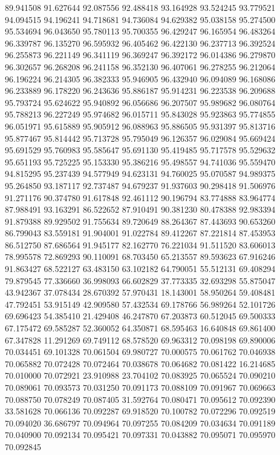 89.941508
91.627644
92.087556
92.488418
93.164928
93.524245
93.779521
94.094515
94.196241
94.718681
94.736084
94.629382
95.038158
95.274500
95.534694
96.043650
95.780113
95.700355
96.429247
96.165954
96.483264
96.339787
96.135270
96.595932
96.405462
96.422130
96.237713
96.392524
96.255873
96.221149
96.341119
96.369247
96.392172
96.014386
96.279870
96.302657
96.268208
96.241158
96.352130
96.407061
96.278255
96.212064
96.196224
96.214305
96.382333
95.946905
96.432940
96.094089
96.168086
96.233889
96.178220
96.243636
95.886187
95.914231
96.223538
96.209688
95.793724
95.624622
95.940892
96.056686
96.207507
95.989682
96.080764
95.788213
96.227249
95.974682
96.015711
95.843028
95.923863
95.774855
96.051971
95.615889
95.905912
96.088963
95.886505
95.931397
95.813716
95.877467
95.814442
95.713728
95.795049
96.126357
96.029084
95.669424
95.691529
95.760983
95.585647
95.691130
95.419485
95.717578
95.529632
95.651193
95.725225
95.153330
95.386216
95.498557
94.741036
95.559470
94.815295
95.237439
94.577949
94.623131
94.760025
95.070587
94.989375
95.264850
93.187117
92.737487
94.679237
91.937603
90.298418
91.506976
91.271176
90.374780
91.617848
92.461112
90.196794
83.774888
83.964774
87.988491
93.163291
86.522652
87.910491
90.381230
80.478388
92.983394
91.879388
89.929502
91.755634
89.720649
88.264367
87.443693
90.653260
86.799043
83.559181
91.904001
91.022784
89.412267
87.221814
87.453953
86.512750
87.686564
91.945177
82.162770
76.221034
91.511520
83.606013
78.995578
72.869293
90.110091
68.703450
65.213557
89.593623
67.916246
91.863427
68.522127
63.483150
63.102182
64.790051
55.512131
69.408294
79.879545
77.336660
36.998093
66.602829
37.773335
32.693298
55.875047
43.942367
37.078434
28.670392
57.970431
18.143001
58.950264
59.408481
47.792451
53.915149
42.909580
57.432534
69.178766
56.989264
52.101726
69.696423
54.385410
21.429408
46.247870
67.203873
60.512045
69.500333
67.175472
69.585287
52.360052
64.350871
68.595463
16.640848
69.861400
67.347828
11.291269
69.749112
68.578520
69.963312
70.098198
69.890006
70.034451
69.101328
70.061504
69.980727
70.000575
70.061762
70.046938
70.065882
70.072428
70.072464
70.038678
70.064682
70.081422
16.214685
70.010000
70.072921
23.910988
23.704102
70.083925
70.065524
70.090210
70.089061
70.093573
70.031250
70.091173
70.088109
70.091967
70.069663
70.088750
70.078249
70.087405
31.592764
70.080471
70.095612
70.092390
33.581628
70.066136
70.092287
69.918520
70.100782
70.072296
70.092519
70.094020
36.686797
70.094964
70.097255
70.084209
70.034634
70.091189
70.040900
70.092134
70.095421
70.097331
70.043882
70.095071
70.095970
70.092845
